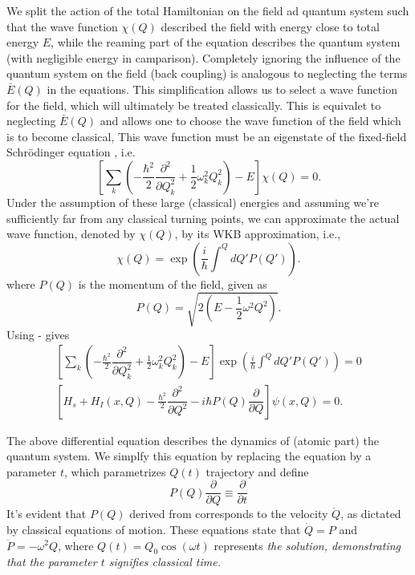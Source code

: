 We split the action of the total Hamiltonian on the field ad quantum system such that the 
wave function \(\chi(Q)\) described the field with energy close to total energy \(E\), while 
the reaming part of the equation describes the quantum system (with negligible energy in camparison).
Completely ignoring the influence of the quantum system on the field (back coupling) is analogous 
to neglecting the terms \(\bar{E}(Q)\) in the equations. This simplification allows us 
to select a wave function for the field, which will ultimately be treated classically. 
This is equivalet to neglecting \(\bar{E}(Q)\) and allows one to choose the wave function of the
field which is to become classical, This wave function must be an eigenstate of the fixed-field Schrödinger equation
, i.e.
\begin{equation}
    \label{eq:class_jcm_eq10}
    \left[\sum_k \left(-\frac{\hbar^2}{2}\dfrac{\partial^2}{\partial Q_k^2}
    + \frac{1}{2} \omega_k^2 Q_k^2\right)
    - E \right]\chi(Q) = 0.
\end{equation}
Under the assumption of these large (classical) energies and assuming we're sufficiently far from any 
classical turning points, we can approximate the actual wave function, denoted by $\chi(Q)$,
 by its WKB approximation, i.e., 
 \begin{equation}
    \label{eq:class_jcm_eq11}
    \chi(Q) = \exp\left(\frac{i}{\hbar}\int ^Q dQ' P(Q')\right).
 \end{equation}
where \(P(Q)\) is the momentum of the field, given as 
\begin{equation}
    \label{eq:class_jcm_eq12}
    P(Q) = \sqrt{2\left(E - \frac{1}{2}\omega^2 Q^2\right)}.
\end{equation}
Using  -  gives
\begin{eqnarray}
    \label{eq:class_jcm_eq13}
    \left[\sum_k \left(-\frac{\hbar^2}{2}\dfrac{\partial^2}{\partial Q_k^2}
    + \frac{1}{2} \omega_k^2 Q_k^2\right)
    - E \right]\exp\left(\frac{i}{\hbar}\int ^Q dQ' P(Q')\right) = 0 \nonumber \\
    \left[
        H_s + H_I(x, Q) - \frac{\hbar^2}{2} \dfrac{\partial^2}{\partial Q^2}
    - i\hbar P(Q) \dfrac{\partial}{\partial Q}\right] \psi(x, Q) = 0. 
\end{eqnarray}

The above differential equation describes the dynamics of (atomic part) 
the quantum system. We simplfy this equation by replacing the equation by a parameter $t$, 
which parametrizes $Q(t)$ trajectory and define
\begin{equation}
    \label{eq:class_jcm_eq14}
    P(Q)\dfrac{\partial}{\partial Q} \equiv \dfrac{\partial }{\partial t}
\end{equation}
It's evident that $P(Q)$ derived from  corresponds to the velocity 
$\dot{Q}$, as dictated by classical equations of motion. These equations state that
$\dot{Q} = P$ and $\ddot{P} = -\omega^2 Q$, where $Q(t) = Q_0 \cos(\omega t)$ represents 
\textit{the solution, demonstrating that the parameter $t$ signifies classical time.}

